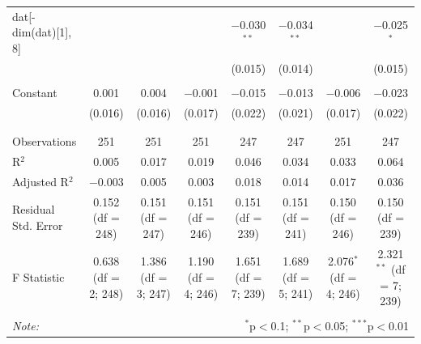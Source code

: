 \begin{table}[!htbp]
\begin{tabular}{@{\extracolsep{5pt}}lccccccc}
 dat[-dim(dat)[1], 8] &  &  &  & $-$0.030$^{**}$ & $-$0.034$^{**}$ &  & $-$0.025$^{*}$ \\ 
  &  &  &  & (0.015) & (0.014) &  & (0.015) \\ 
  & & & & & & & \\ 
 Constant & 0.001 & 0.004 & $-$0.001 & $-$0.015 & $-$0.013 & $-$0.006 & $-$0.023 \\ 
  & (0.016) & (0.016) & (0.017) & (0.022) & (0.021) & (0.017) & (0.022) \\ 
  & & & & & & & \\ 
\hline \\[-1.8ex] 
Observations & 251 & 251 & 251 & 247 & 247 & 251 & 247 \\ 
R$^{2}$ & 0.005 & 0.017 & 0.019 & 0.046 & 0.034 & 0.033 & 0.064 \\ 
Adjusted R$^{2}$ & $-$0.003 & 0.005 & 0.003 & 0.018 & 0.014 & 0.017 & 0.036 \\ 
Residual Std. Error & 0.152 (df = 248) & 0.151 (df = 247) & 0.151 (df = 246) & 0.151 (df = 239) & 0.151 (df = 241) & 0.150 (df = 246) & 0.150 (df = 239) \\ 
F Statistic & 0.638 (df = 2; 248) & 1.386 (df = 3; 247) & 1.190 (df = 4; 246) & 1.651 (df = 7; 239) & 1.689 (df = 5; 241) & 2.076$^{*}$ (df = 4; 246) & 2.321$^{**}$ (df = 7; 239) \\ 
\hline 
\hline \\[-1.8ex] 
\textit{Note:}  & \multicolumn{7}{r}{$^{*}$p$<$0.1; $^{**}$p$<$0.05; $^{***}$p$<$0.01} \\ 
\end{tabular} 
\end{table} 
